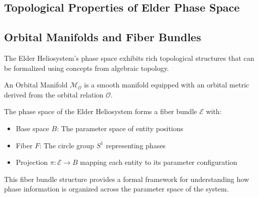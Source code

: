 \begin{theorem}
\begin{definition}
\begin{definition}
\begin{enumerate}
\section{Topological Properties of Elder Phase Space}

\subsection{Orbital Manifolds and Fiber Bundles}

The Elder Heliosystem's phase space exhibits rich topological structures that can be formalized using concepts from algebraic topology.

\begin{definition}
An Orbital Manifold $\mathcal{M}_{\mathcal{O}}$ is a smooth manifold equipped with an orbital metric derived from the orbital relation $\mathcal{O}$.
\end{definition}

\begin{theorem}
The phase space of the Elder Heliosystem forms a fiber bundle $\mathcal{E}$ with:
\begin{itemize}
    \item Base space $B$: The parameter space of entity positions
    \item Fiber $F$: The circle group $S^1$ representing phases
    \item Projection $\pi: \mathcal{E} \to B$ mapping each entity to its parameter configuration
\end{itemize}
\end{theorem}

This fiber bundle structure provides a formal framework for understanding how phase information is organized across the parameter space of the system.

\begin{figure}[h]
\centering
{}
\end{figure}
\end{enumerate}
\end{definition}
\end{definition}
\end{theorem}
